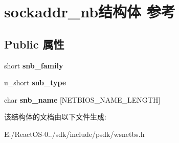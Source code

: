 \hypertarget{structsockaddr__nb}{}\section{sockaddr\+\_\+nb结构体 参考}
\label{structsockaddr__nb}
\subsection*{Public 属性}
\begin{DoxyCompactItemize}
\item 
\mbox{\label{structsockaddr__nb_a95f171668c38b9a7a4c0dbc266cce4de}} 
short {\bfseries snb\+\_\+family}
\item 
\mbox{\label{structsockaddr__nb_ad7ac1527cee264894b172ba0d9cf180f}} 
u\+\_\+short {\bfseries snb\+\_\+type}
\item 
\mbox{\label{structsockaddr__nb_abf1950efdaea987684a423adf5886e76}} 
char {\bfseries snb\+\_\+name} \mbox{[}N\+E\+T\+B\+I\+O\+S\+\_\+\+N\+A\+M\+E\+\_\+\+L\+E\+N\+G\+TH\mbox{]}
\end{DoxyCompactItemize}


该结构体的文档由以下文件生成\+:\begin{DoxyCompactItemize}
\item 
E\+:/\+React\+O\+S-\/0../sdk/include/psdk/wsnetbs.\+h\end{DoxyCompactItemize}
